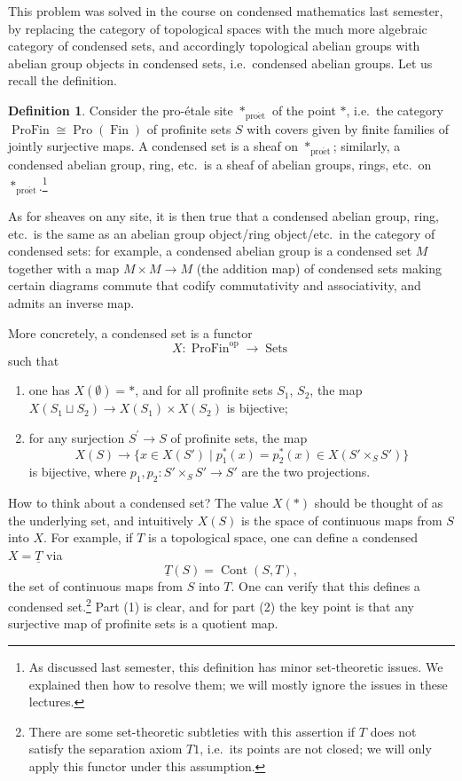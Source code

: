 \documentclass[11pt]{amsbook}
\DeclareMathOperator{\Cont}{Cont}
\DeclareMathOperator{\Sets}{Sets}
\DeclareMathOperator{\op}{op}
\DeclareMathOperator{\ProFin}{ProFin}
\DeclareMathOperator{\Pro}{Pro}
\DeclareMathOperator{\Fin}{Fin}
\renewcommand{\op}{{\mathrm{op}}}
\newcommand{\proet}{{\mathrm{pro\acute{e}t}}}
\numberwithin{equation}{section}
\numberwithin{theorem}{section}
\theoremstyle{definition}
\newtheorem{definition}[theorem]{Definition}
\begin{document}
This problem was solved in the course on condensed mathematics last semester, by replacing the category of topological spaces with the much more algebraic category of condensed sets, and accordingly topological abelian groups with abelian group objects in condensed sets, i.e.~condensed abelian groups. Let us recall the definition.

\begin{definition} Consider the pro-\'etale site $\ast_\proet$ of the point $\ast$, i.e.~the category $\ProFin\cong \Pro(\Fin)$ of profinite sets $S$ with covers given by finite families of jointly surjective maps. A condensed set is a sheaf on $\ast_\proet$; similarly, a condensed abelian group, ring, etc.~is a sheaf of abelian groups, rings, etc.~on $\ast_\proet$.\footnote{As discussed last semester, this definition has minor set-theoretic issues. We explained then how to resolve them; we will mostly ignore the issues in these lectures.}
\end{definition}

As for sheaves on any site, it is then true that a condensed abelian group, ring, etc.~is the same as an abelian group object/ring object/etc.~in the category of condensed sets: for example, a condensed abelian group is a condensed set $M$ together with a map $M\times M\to M$ (the addition map) of condensed sets making certain diagrams commute that codify commutativity and associativity, and admits an inverse map.

More concretely, a condensed set is a functor
\[
X: \ProFin^\op\to \Sets
\]
such that
\begin{enumerate}
\item one has $X(\emptyset)=\ast$, and for all profinite sets $S_1$, $S_2$, the map $X(S_1\sqcup S_2)\to X(S_1)\times X(S_2)$ is bijective;
\item for any surjection $S^\prime\to S$ of profinite sets, the map
\[
X(S)\to \{x\in X(S')\mid p_1^\ast(x) = p_2^\ast(x)\in X(S'\times_S S')\}
\]
is bijective, where $p_1,p_2: S'\times_S S'\to S'$ are the two projections.
\end{enumerate}

How to think about a condensed set? The value $X(\ast)$ should be thought of as the underlying set, and intuitively $X(S)$ is the space of continuous maps from $S$ into $X$. For example, if $T$ is a topological space, one can define a condensed $X=\underline{T}$ via
\[
\underline{T}(S) = \Cont(S,T),
\]
the set of continuous maps from $S$ into $T$. One can verify that this defines a condensed set.\footnote{There are some set-theoretic subtleties with this assertion if $T$ does not satisfy the separation axiom $T1$, i.e.~its points are not closed; we will only apply this functor under this assumption.} Part (1) is clear, and for part (2) the key point is that any surjective map of profinite sets is a quotient map.
\end{document}
